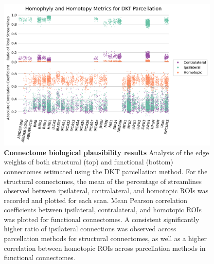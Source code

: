 \begin{figure}
    \centering
    \includegraphics[width=1\textwidth]{figures/m2g/figure4.pdf}
    \caption[Analysis of the edge weights of both structural (top) and functional (bottom) connectomes estimated using the DKT parcellation method.]{\textbf{Connectome biological plausibility results} Analysis of the edge weights of both structural (top) and functional (bottom) connectomes estimated using the DKT parcellation method. For the structural connectomes, the mean of the percentage of streamlines observed between ipsilateral, contralateral, and homotopic ROIs was recorded and plotted for each scan. Mean Pearson correlation coefficients between ipsilateral, contralateral, and homotopic ROIs was plotted for functional connectomes. A consistent significantly higher ratio of ipsilateral connections was observed across parcellation methods for structural connectomes, as well as a higher correlation between homotopic ROIs across parcellation methods in functional connectomes.}
    \label{fig:ipsi}
\end{figure}


